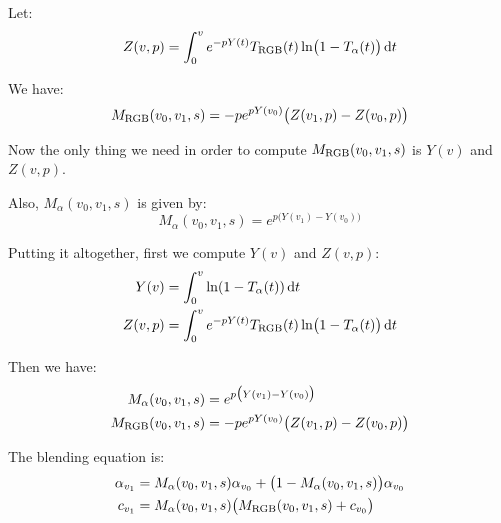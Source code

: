 \documentclass[letter, 11pt]{article}
\begin{document}
Let:
\begin{equation*}
Z(v, p) = \int_{0}^{v}{ e^{-p Y(t)} }T_{\mathrm{RGB}}(t) \ln\bigl(1-T_\alpha(t)\bigr) \, {\mathrm{d} t}
\end{equation*}

We have:
\begin{equation*}
M_{\mathrm{RGB}}(v_0, v_1, s) = -p e^{p Y(v_0)} \big(Z(v_1, p) - Z(v_0, p)\big)
\end{equation*}

Now the only thing we need in order to compute $M_{\mathrm{RGB}}(v_0, v_1, s)$ is $Y(v)$ and $Z(v, p)$.

Also, $M_\alpha(v_0, v_1, s)$ is given by:
\begin{equation*}
M_\alpha(v_0, v_1, s) = e^{p \big(Y(v_1)-Y(v_0)\big)}
\end{equation*}

Putting it altogether, first we compute $Y(v)$ and $Z(v, p)$:
\begin{align*}
Y(v) &= \int_0^v\ln(1 - T_\alpha(t)) \, \mathrm{d} t \\
Z(v, p) &= \int_{0}^{v}{ e^{-p Y(t)} }T_{\mathrm{RGB}}(t) \ln\bigl(1-T_\alpha(t)\bigr) \, {\mathrm{d} t}
\end{align*}

Then we have:
\begin{align*}
M_\alpha(v_0, v_1, s) &= e^{p \big(Y(v_1)-Y(v_0)\big)} \\
M_{\mathrm{RGB}}(v_0, v_1, s) &= -p e^{p Y(v_0)} \big(Z(v_1, p) - Z(v_0, p)\big)
\end{align*}

The blending equation is:
\begin{align*}
\alpha_{v_1} &= M_\alpha(v_0, v_1, s) \alpha_{v_0} + \bigl(1 - M_\alpha(v_0, v_1, s)\bigr) \alpha_{v_0} \label{eq:malpha2eliminate} \\
c_{v_1} &= M_\alpha(v_0, v_1, s) \big(M_{\mathrm{RGB}}(v_0, v_1, s) + c_{v_0}\big)
\end{align*}
\end{document}
